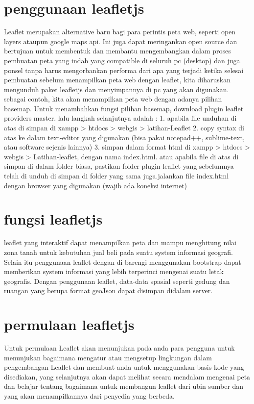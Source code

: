 \section{penggunaan leafletjs}
Leaflet merupakan alternative baru bagi para perintis peta web, seperti open layers ataupun google maps api. Ini juga dapat meringankan open source dan bertujuan untuk membentuk dan membantu mengembangkan dalam proses pembuatan peta yang indah yang compatible di seluruh pc (desktop) dan juga ponsel tanpa harus mengorbankan performa dari apa yang terjadi ketika selesai pembuatan
sebelum menampilkan peta web dengan leaflet, kita diharuskan mengunduh paket leafletjs dan menyimpannya di pc yang akan digunakan. 
sebagai contoh, kita akan menampilkan peta web dengan adanya pilihan basemap. Untuk menambahkan fungsi pilihan basemap, download plugin leaflet providers master. lalu langkah selanjutnya adalah :
1. apabila file unduhan di atas di simpan di xampp > htdocs > webgis > latihan-Leaflet
2. copy syntax di atas ke dalam text-editor yang digunakan (bisa pakai notepad++, sublime-text, atau software sejenis lainnya)
3. simpan dalam format html di xampp > htdocs > webgis > Latihan-leaflet, dengan nama index.html. atau apabila file di atas di simpan di      dalam folder biasa, pastikan folder plugin leaflet yang sebelumnya telah di unduh di simpan di folder yang sama juga.jalankan file          index.html dengan browser yang digunakan (wajib ada koneksi internet)

\section{fungsi leafletjs}
leaflet yang interaktif dapat menampilkan peta dan mampu menghitung nilai zona tanah untuk kebutuhan jual beli pada suatu system informasi geografi. Selain itu penggunaan leaflet dengan di barengi menggunakan bootstrap dapat memberikan system informasi yang lebih terperinci mengenai suatu letak geografis. Dengan penggunaan leaflet, data-data spasial seperti gedung dan ruangan yang berupa format geoJson dapat disimpan didalam server. 

\section{permulaan leafletjs}
Untuk permulaan Leaflet akan menunjukan pada anda para pengguna untuk menunjukan bagaimana mengatur atau mengsetup lingkungan dalam pengembangan Leaflet dan membuat anda untuk menggunakan basis kode yang disediakan, yang selanjutnya akan dapat melihat secara mendalam mengenai peta dan belajar tentang bagaimana untuk membangun leaflet dari ubin sumber dan yang akan menampilkannya dari penyedia yang berbeda.
